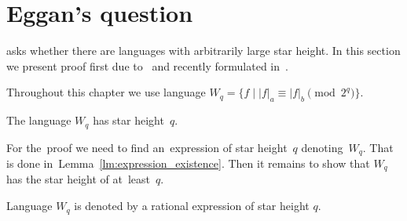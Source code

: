 \chapter{Eggan's question}

\cite{Eggan63} asks whether there are languages with arbitrarily large star height. In this section we present proof first due to~\cite{DejeanSchutzenberger66} and recently formulated in~\cite{Sakarovitch09}.

Throughout this chapter we use language $W_q = {\{f \mid |f|_a \equiv |f|_b \pmod{2^q} \}}$.

\begin{thm}\label{thm:main}
    The language $W_q$ has star height~$q$.
\end{thm}

For the~proof we need to find an~expression of star height~$q$ denoting~$W_q$. That is done in~Lemma~\ref*{lm:expression_existence}. Then it remains to show that $W_q$ has the star height of at~least~$q$.

\begin{lemma}\label{lm:expression_existence}
    Language $W_q$ is denoted by a rational expression of star height $q$.
\end{lemma}

